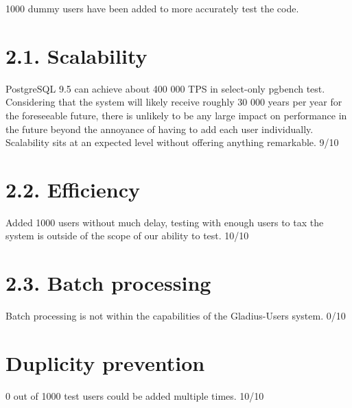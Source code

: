 \documentclass[]{report}
\begin{document}
		1000 dummy users have been added to more accurately test the code.
		
	\section*{2.1. Scalability}
		PostgreSQL 9.5 can achieve about 400 000 TPS in select-only pgbench test. Considering that the system will likely receive roughly 30 000 years per year for the foreseeable future, there is unlikely to be any large impact on performance in the future beyond the annoyance of having to add each user individually. Scalability sits at an expected level without offering anything remarkable. 9/10
		
	\section*{2.2. Efficiency} 
		Added 1000 users without much delay, testing with enough users to tax the system is outside of the scope of our ability to test. 10/10  
		
	\section*{2.3. Batch processing}
		Batch processing is not within the capabilities of the Gladius-Users system. 0/10
		
	\section*{Duplicity prevention}
		0 out of 1000 test users could be added multiple times. 10/10
	
\end{document}
